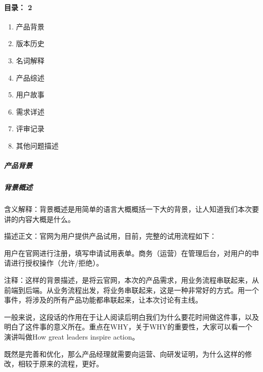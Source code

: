 \documentclass[letterpaper,10pt,english]{sphinxmanual}
\begin{document}
\paragraph{目录： 2\sphinxfootnotemark[567]}
\label{\detokenize{chapter_knowledge/PRD:id11}}%
\begin{footnotetext}[567]\sphinxAtStartFootnote
{}
%
\end{footnotetext}\ignorespaces \begin{enumerate}
%
\item {} 
产品背景

\item {} 
版本历史

\item {} 
名词解释

\item {} 
产品综述

\item {} 
用户故事

\item {} 
需求详述

\item {} 
评审记录

\item {} 
其他问题描述

\end{enumerate}


\subparagraph{产品背景}
\label{\detokenize{chapter_knowledge/PRD:id12}}

\subparagraph{背景概述}
\label{\detokenize{chapter_knowledge/PRD:id13}}
含义解释：背景概述是用简单的语言大概概括一下大的背景，让人知道我们本次要讲的内容大概是什么。

描述正文：官网为用户提供产品试用，目前，完整的试用流程如下：

用户在官网进行注册，填写申请试用表单。商务（运营）在管理后台，对用户的申请进行授权操作（允许/拒绝）。

注释：这样的背景描述，是将云官网，本次的产品需求，用业务流程串联起来，从前端到后端。从业务流程出发，将业务串联起来，这是一种非常好的方式。用一个事件，将涉及的所有产品功能都串联起来，让本次讨论有主线。

一般来说，这段话的作用在于让人阅读后明白我们为什么要花时间做这件事，以及明白了这件事的意义所在。重点在WHY，关于WHY的重要性，大家可以看一个演讲叫做How
great leaders inspire action。

既然是完善和优化，那么产品经理就需要向运营、向研发证明，为什么这样的修改，相较于原来的流程，更好。
\end{document}
